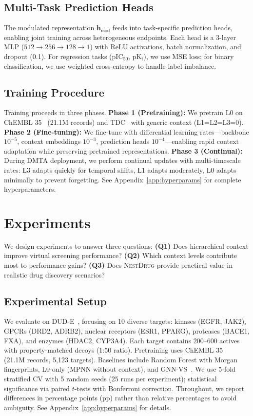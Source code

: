 \documentclass[sigconf]{acmart}
\newcommand{\methodname}{\textsc{NestDrug}}
\newcommand{\hmod}{\mathbf{h}_{\text{mod}}}
\begin{document}
\subsection{Multi-Task Prediction Heads}

The modulated representation $\hmod$ feeds into task-specific prediction heads, enabling joint training across heterogeneous endpoints. Each head is a 3-layer MLP ($512 \rightarrow 256 \rightarrow 128 \rightarrow 1$) with ReLU activations, batch normalization, and dropout (0.1). For regression tasks (pIC$_{50}$, pK$_i$), we use MSE loss; for binary classification, we use weighted cross-entropy to handle label imbalance.

\subsection{Training Procedure}

Training proceeds in three phases. \textbf{Phase 1 (Pretraining):} We pretrain L0 on ChEMBL 35~\cite{zdrazil_2024_chembl} (21.1M records) and TDC~\cite{huang_2021_tdc} with generic context (L1=L2=L3=0). \textbf{Phase 2 (Fine-tuning):} We fine-tune with differential learning rates---backbone $10^{-5}$, context embeddings $10^{-3}$, prediction heads $10^{-4}$---enabling rapid context adaptation while preserving pretrained representations. \textbf{Phase 3 (Continual):} During DMTA deployment, we perform continual updates with multi-timescale rates: L3 adapts quickly for temporal shifts, L1 adapts moderately, L0 adapts minimally to prevent forgetting. See Appendix~\ref{app:hyperparams} for complete hyperparameters.

\section{Experiments}
\label{sec:experiments}

We design experiments to answer three questions: \textbf{(Q1)} Does hierarchical context improve virtual screening performance? \textbf{(Q2)} Which context levels contribute most to performance gains? \textbf{(Q3)} Does \methodname{} provide practical value in realistic drug discovery scenarios?

\subsection{Experimental Setup}

We evaluate on DUD-E~\cite{mysinger_2012_dude}, focusing on 10 diverse targets: kinases (EGFR, JAK2), GPCRs (DRD2, ADRB2), nuclear receptors (ESR1, PPARG), proteases (BACE1, FXA), and enzymes (HDAC2, CYP3A4). Each target contains 200--600 actives with property-matched decoys (1:50 ratio). Pretraining uses ChEMBL 35~\cite{zdrazil_2024_chembl} (21.1M records, 5{,}123 targets). Baselines include Random Forest with Morgan fingerprints, L0-only (MPNN without context), and GNN-VS~\cite{lim_2019_gnn_vs}. We use 5-fold stratified CV with 5 random seeds (25 runs per experiment); statistical significance via paired $t$-tests with Bonferroni correction. Throughout, we report differences in percentage points (pp) rather than relative percentages to avoid ambiguity. See Appendix~\ref{app:hyperparams} for details.
\end{document}
